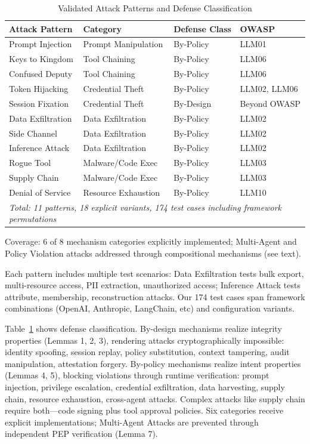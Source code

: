 \begin{table}[t]
\centering
\caption{Validated Attack Patterns and Defense Classification}
\label{tab:attack-patterns}
\scriptsize
\begin{tabular}{|p{3.5cm}|p{3.5cm}|p{2.5cm}|p{3cm}|}
\hline
\textbf{Attack Pattern} & \textbf{Category} & \textbf{Defense Class} & \textbf{OWASP} \\
\hline
Prompt Injection & Prompt Manipulation & By-Policy & LLM01 \\
\hline
Keys to Kingdom & Tool Chaining & By-Policy & LLM06 \\
\hline
Confused Deputy & Tool Chaining & By-Policy & LLM06 \\
\hline
Token Hijacking & Credential Theft & By-Policy & LLM02, LLM06 \\
\hline
Session Fixation & Credential Theft & By-Design & Beyond OWASP \\
\hline
Data Exfiltration & Data Exfiltration & By-Policy & LLM02 \\
\hline
Side Channel & Data Exfiltration & By-Policy & LLM02 \\
\hline
Inference Attack & Data Exfiltration & By-Policy & LLM02 \\
\hline
Rogue Tool & Malware/Code Exec & By-Policy & LLM03 \\
\hline
Supply Chain & Malware/Code Exec & By-Policy & LLM03 \\
\hline
Denial of Service & Resource Exhaustion & By-Policy & LLM10 \\
\hline
\multicolumn{4}{|l|}{\small\textit{Total: 11 patterns, 18 explicit variants, 174 test cases including framework permutations}} \\
\hline
\end{tabular}

\raggedright
\scriptsize{Coverage: 6 of 8 mechanism categories explicitly implemented; Multi-Agent and Policy Violation attacks addressed through compositional mechanisms (see text).}
\end{table}

Each pattern includes multiple test scenarios: Data Exfiltration tests bulk export, multi-resource access, PII extraction, unauthorized access; Inference Attack tests attribute, membership, reconstruction attacks. Our 174 test cases span framework combinations (OpenAI, Anthropic, LangChain, etc) and configuration variants.

Table~\ref{tab:attack-patterns} shows defense classification. By-design mechanisms realize integrity properties (Lemmas 1, 2, 3), rendering attacks cryptographically impossible: identity spoofing, session replay, policy substitution, context tampering, audit manipulation, attestation forgery. By-policy mechanisms realize intent properties (Lemmas 4, 5), blocking violations through runtime verification: prompt injection, privilege escalation, credential exfiltration, data harvesting, supply chain, resource exhaustion, cross-agent attacks. Complex attacks like supply chain require both—code signing plus tool approval policies. Six categories receive explicit implementations; Multi-Agent Attacks are prevented through independent PEP verification (Lemma 7).

